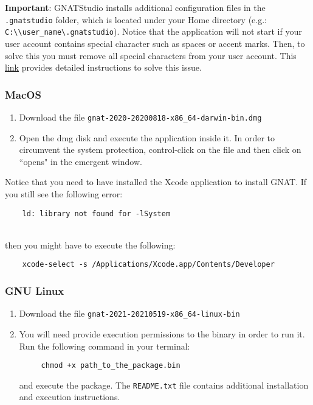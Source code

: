 \textbf{\textcolor{mRedBrown}{Important}}:
GNATStudio installs additional configuration files in the \texttt{.gnatstudio} folder,
which is located under your Home directory (e.g.: \texttt{C:\textbackslash{}\textbackslash{}user\_name\textbackslash{}.gnatstudio}).
Notice that the application will not start if your user account contains special character such as spaces or accent marks.
Then, to solve this you must remove all special characters from your user account.
This 
\href{https://superuser.com/questions/890812/how-to-rename-the-user-folder-in-windows-10/1346983#1346983}
{link}
provides detailed instructions to solve this issue.

\subsubsection*{MacOS}
\begin{enumerate}
\item Download the file \texttt{gnat-2020-20200818-x86\_64-darwin-bin.dmg}
\item Open the dmg disk and execute the application inside it.
In order to circumvent the system protection,
control-click on the file and then click on ``opens" in the emergent window.
\end{enumerate}

Notice that you need to have installed the Xcode application to install GNAT.
If you still see the following error:

\begin{BVerbatim}
	ld: library not found for -lSystem
\end{BVerbatim}
\\

then you might have to execute the following:

\begin{BVerbatim}
	xcode-select -s /Applications/Xcode.app/Contents/Developer
\end{BVerbatim}

\subsubsection*{GNU Linux}
\begin{enumerate}
\item Download the file \texttt{gnat-2021-20210519-x86\_64-linux-bin}
\item You will need provide execution permissions to the binary in order to run it.
Run the following command in your terminal:

\begin{BVerbatim}
     chmod +x path_to_the_package.bin
\end{BVerbatim}

and execute the package. The \texttt{README.txt} file
contains additional installation and execution instructions.
\end{enumerate}

